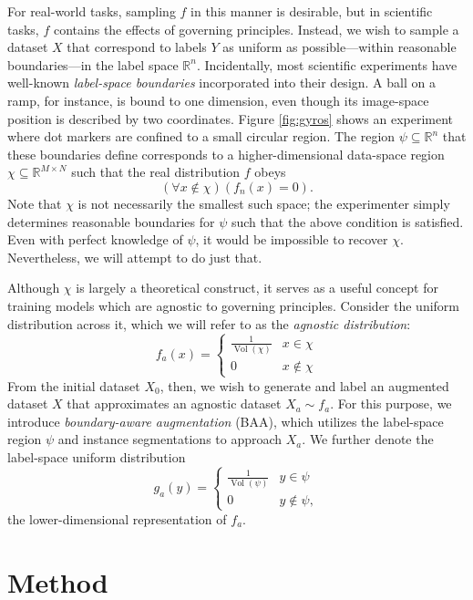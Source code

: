 \documentclass[10pt, draftcls]{IEEEtran}
\DeclareMathOperator{\vol}{Vol}
\begin{document}
For real-world tasks, sampling $f$ in this manner is desirable, but in
scientific tasks, $f$ contains the effects of governing principles. Instead, we
wish to sample a dataset $X$ that correspond to labels $Y$ as uniform as
possible---within reasonable boundaries---in the label space
$\mathbb{R}^n$. Incidentally, most scientific experiments have well-known
\emph{label-space boundaries} incorporated into their design. A ball on a
ramp, for instance, is bound to one dimension, even though its image-space
position is described by two coordinates. Figure \ref{fig:gyros} shows an
experiment where dot markers are confined to a small circular region. The region
$\psi \subseteq \mathbb{R}^n$ that these boundaries define corresponds to a
higher-dimensional data-space region $\chi \subseteq \mathbb{R}^{M\times N}$
such that the real distribution $f$ obeys
\[ (\forall x \not\in \chi)(f_n(x) = 0). \] Note that $\chi$ is not necessarily
the smallest such space; the experimenter simply determines reasonable
boundaries for $\psi$ such that the above condition is satisfied. Even with
perfect knowledge of $\psi$, it would be impossible to recover
$\chi$. Nevertheless, we will attempt to do just that.

Although $\chi$ is largely a theoretical construct, it serves as a useful
concept for training models which are agnostic to governing principles. Consider
the uniform distribution across it, which we will refer to as the \emph{agnostic
  distribution}:
\[ f_a(x) =
  \begin{cases}
    \frac{1}{\vol(\chi)} & x \in \chi \\
    0 & x \not\in \chi
  \end{cases}
\] From the initial dataset $X_0$, then, we wish to generate and label an
augmented dataset $X$ that approximates an agnostic dataset $X_a \sim f_a$. For
this purpose, we introduce \emph{boundary-aware augmentation} (BAA), which
utilizes the label-space region $\psi$ and instance segmentations to approach
$X_a$. We further denote the label-space uniform distribution
\[ g_a(y) =
  \begin{cases}
    \frac{1}{\vol(\psi)} & y \in \psi \\
    0 & y \not\in \psi,
  \end{cases}
\] the lower-dimensional representation of $f_a$.


\section{Method}
\label{sec:method}
\end{document}
